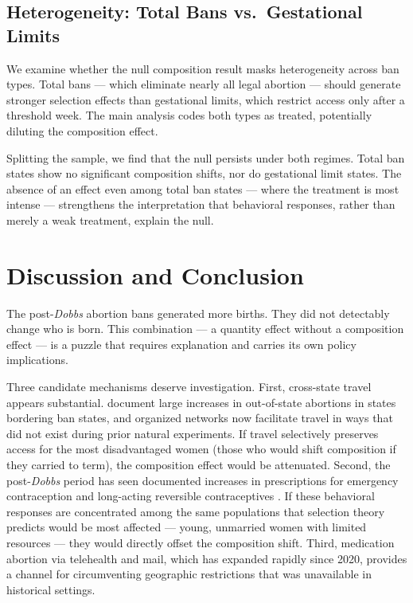 \documentclass[12pt]{article}
\begin{document}



\subsection{Heterogeneity: Total Bans vs.\ Gestational Limits}

We examine whether the null composition result masks heterogeneity across ban types. Total bans --- which eliminate nearly all legal abortion --- should generate stronger selection effects than gestational limits, which restrict access only after a threshold week. The main analysis codes both types as treated, potentially diluting the composition effect.

Splitting the sample, we find that the null persists under both regimes. Total ban states show no significant composition shifts, nor do gestational limit states. The absence of an effect even among total ban states --- where the treatment is most intense --- strengthens the interpretation that behavioral responses, rather than merely a weak treatment, explain the null.


\section{Discussion and Conclusion}
\label{sec:conclusion}

The post-\emph{Dobbs} abortion bans generated more births. They did not detectably change who is born. This combination --- a quantity effect without a composition effect --- is a puzzle that requires explanation and carries its own policy implications.

Three candidate mechanisms deserve investigation. First, cross-state travel appears substantial. \citet{myers2024effects} document large increases in out-of-state abortions in states bordering ban states, and organized networks now facilitate travel in ways that did not exist during prior natural experiments. If travel selectively preserves access for the most disadvantaged women (those who would shift composition if they carried to term), the composition effect would be attenuated. Second, the post-\emph{Dobbs} period has seen documented increases in prescriptions for emergency contraception and long-acting reversible contraceptives \citep{lin2024contraception}. If these behavioral responses are concentrated among the same populations that selection theory predicts would be most affected --- young, unmarried women with limited resources --- they would directly offset the composition shift. Third, medication abortion via telehealth and mail, which has expanded rapidly since 2020, provides a channel for circumventing geographic restrictions that was unavailable in historical settings.
\end{document}
